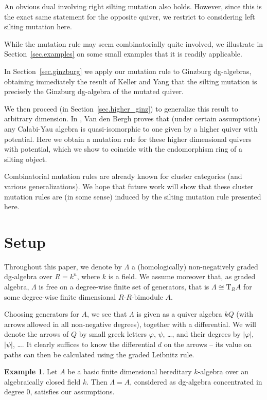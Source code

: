 \documentclass[a4paper,11pt]{amsart}
\theoremstyle{definition}
\newtheorem{example}[theorem]{Example}
\newcommand{\iso}{\cong}
\numberwithin{theorem}{section}
\begin{document}
An obvious dual involving right silting mutation also holds. However, since this is the exact same statement for the opposite quiver, we restrict to considering left silting mutation here.

\medskip
While the mutation rule may seem combinatorially quite involved, we illustrate in Section~\ref{sec.examples} on some small examples that it is readily applicable.

In Section~\ref{sec.ginzburg} we apply our mutation rule to Ginzburg dg-algebras, obtaining immediately the result of Keller and Yang \cite{keller-yang} that the silting mutation is precisely the Ginzburg dg-algebra of the mutated quiver.

We then proceed (in Section~\ref{sec.higher_ginz}) to generalize this result to arbitrary dimension. In \cite{van_den_bergh}, Van den Bergh proves that (under certain assumptions) any Calabi-Yau algebra is quasi-isomorphic to one given by a higher quiver with potential. Here we obtain a mutation rule for these higher dimensional quivers with potential, which we show to coincide with the endomorphism ring of a silting object.

\medskip
Combinatorial mutation rules are already known for cluster categories (and various generalizations). We hope that future work will show that these cluster mutation rules are (in some sense) induced by the silting mutation rule presented here.

\section{Setup} \label{sect.setup}

Throughout this paper, we denote by $\Lambda$ a (homologically) non-negatively graded dg-algebra over $R = k^n$, where $k$ is a field. We assume moreover that, as graded algebra, $\Lambda$ is free on a degree-wise finite set of generators, that is $\Lambda \iso {\mathrm T}_R A$ for some degree-wise finite dimensional $R$-$R$-bimodule $A$.

Choosing generators for $A$, we see that $\Lambda$ is given as a quiver algebra $kQ$ (with arrows allowed in all non-negative degrees), together with a differential. We will denote the arrows of $Q$ by small greek letters $\varphi$, $\psi$, \dots, and their degrees by $|\varphi|$, $|\psi|$, \dots . It clearly suffices to know the differential $d$ on the arrows -- its value on paths can then be calculated using the graded Leibnitz rule.

\begin{example}
Let $A$ be a basic finite dimensional hereditary $k$-algebra over an algebraically closed field $k$. Then $\Lambda=A$, considered as dg-algebra concentrated in degree $0$, satisfies our assumptions.
\end{example}
\end{document}
